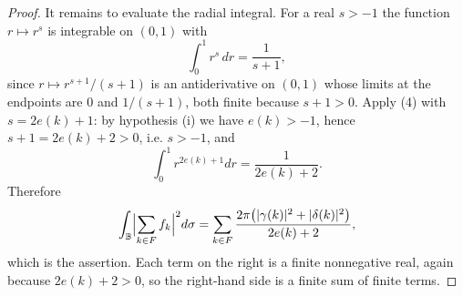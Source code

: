 \begin{proof}
It remains to evaluate the radial integral.  For a real $s>-1$ the function
$r\mapsto r^{s}$ is integrable on $(0,1)$ with
\begin{equation}\tag{4}
  \int_{0}^{1}r^{s}\,dr=\frac{1}{s+1},
\end{equation}
since $r\mapsto r^{s+1}/(s+1)$ is an antiderivative on $(0,1)$ whose limits at
the endpoints are $0$ and $1/(s+1)$, both finite because $s+1>0$.  Apply (4)
with $s=2e(k)+1$: by hypothesis (i) we have $e(k)>-1$, hence
$s+1=2e(k)+2>0$, i.e. $s>-1$, and
\[
  \int_{0}^{1}r^{2e(k)+1}dr=\frac{1}{2e(k)+2}.
\]
Therefore
\[
  \int_{\mathbb{B}}\Bigl|\sum_{k\in F}f_k\Bigr|^{2}d\sigma
  =\sum_{k\in F}\frac{2\pi\bigl(|\gamma(k)|^{2}+|\delta(k)|^{2}\bigr)}
      {2e(k)+2},
\]
which is the assertion.  Each term on the right is a finite nonnegative real,
again because $2e(k)+2>0$, so the right-hand side is a finite sum of finite
terms.
\end{proof}
